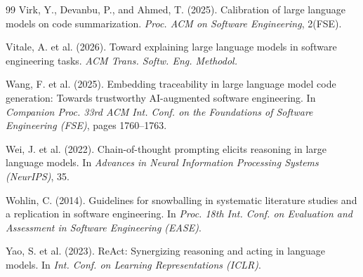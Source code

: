 \documentclass[12pt]{article}
\begin{document}
\begin{thebibliography}{99}
Virk, Y., Devanbu, P., and Ahmed, T. (2025). Calibration of large language models
on code summarization. \textit{Proc. ACM on Software Engineering}, 2(FSE).

Vitale, A. et al. (2026). Toward explaining large language models in software
engineering tasks. \textit{ACM Trans. Softw. Eng. Methodol.}

Wang, F. et al. (2025). Embedding traceability in large language model code
generation: Towards trustworthy AI-augmented software engineering. In
\textit{Companion Proc. 33rd ACM Int. Conf. on the Foundations of Software
Engineering (FSE)}, pages 1760--1763.

Wei, J. et al. (2022). Chain-of-thought prompting elicits reasoning in large
language models. In \textit{Advances in Neural Information Processing Systems
(NeurIPS)}, 35.

Wohlin, C. (2014). Guidelines for snowballing in systematic literature studies
and a replication in software engineering. In \textit{Proc. 18th Int. Conf. on
Evaluation and Assessment in Software Engineering (EASE)}.

Yao, S. et al. (2023). ReAct: Synergizing reasoning and acting in language
models. In \textit{Int. Conf. on Learning Representations (ICLR)}.

\end{thebibliography}
\end{document}
